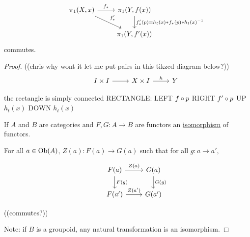 \documentclass[11pt,leqno,oneside]{amsart}
\numberwithin{thm}{section}
\newcommand{\fund}{\pi_1}
\newcommand{\x}{\times}
\newcommand{\id}{\text{id}}
\begin{document}
\begin{thm}
  $$\begin{tikzcd}
    &\fund(X,x) \arrow[r, "f_*"] \arrow[rd, "f'_*"] &\fund(Y,f(x)) \arrow[d, "f_*'(p) = h_t(x) * f_*(p) * h_t(x)^{-1}"] \\
    & &\fund(Y, f'(x))
  \end{tikzcd}$$
  commutes.
\end{thm}
\begin{proof}
  ((chris why wont it let me put pairs in this tikzcd diagram below?))
  $$\begin{tikzcd}
    &I \x I \arrow[r, ""] &X \x I \arrow[r, "h"] &Y
  \end{tikzcd}$$

  the rectangle is simply connected
  RECTANGLE:
  LEFT
  $f \circ p$
  RIGHT
  $f' \circ p$
  UP
  $h_t(x)$
  DOWN
  $h_t(x)$

  If $A$ and $B$ are categories and $F,G\colon A \to B$ are functors an \underline{isomorphism} of functors.

  For all $a \in \text{Ob}(A)$, $Z(a)\colon F(a) \to G(a)$ such that for all $g: a \to a'$,

  $$\begin{tikzcd}
    &F(a) \arrow[r, "Z(a)"] \arrow[d, "F(g)"] & G(a) \arrow[d, "G(g)"] \\
    &F(a') \arrow[r, "Z(a')"]                  & G(a')
  \end{tikzcd}$$

  ((commutes?))

  Note: if $B$ is a groupoid, any natural transformation is an isomorphism.
\end{proof}
\end{document}
